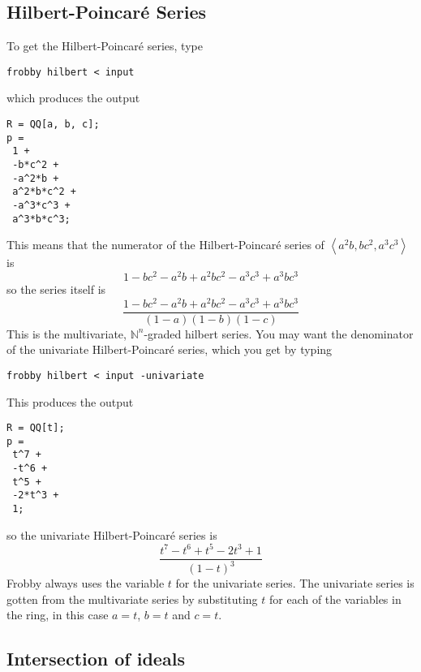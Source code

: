 \documentclass{amsart}
\theoremstyle{definition}
\newcommand{\hp}{Hilbert-Poincar\'e}
\newcommand{\hps}{Hilbert-Poincar\'e series}
\newcommand{\N}{\mathbb{N}}
\newcommand{\ideal}[1]{\left<#1\right>}
\begin{document}
\subsection{\hp{} Series}

To get the \hps{}, type
\begin{verbatim}
frobby hilbert < input
\end{verbatim}
which produces the output
\begin{verbatim}
R = QQ[a, b, c];
p =
 1 +
 -b*c^2 +
 -a^2*b +
 a^2*b*c^2 +
 -a^3*c^3 +
 a^3*b*c^3;
\end{verbatim}
This means that the numerator of the \hps{} of $\ideal{a^2b,bc^2,a^3c^3}$ is
\[
 1 
 -bc^2 
 -a^2b +
 a^2bc^2 
 -a^3c^3 +
 a^3bc^3
\]
so the series itself is
\[
\frac{ 
 1 
 -bc^2 
 -a^2b +
 a^2bc^2 
 -a^3c^3 +
 a^3bc^3
}{
(1-a)(1-b)(1-c)}
\]
This is the multivariate, $\N^n$-graded hilbert series. You may want
the denominator of the univariate \hps{}, which you get by typing
\begin{verbatim}
frobby hilbert < input -univariate
\end{verbatim}
This produces the output
\begin{verbatim}
R = QQ[t];
p =
 t^7 +
 -t^6 +
 t^5 +
 -2*t^3 +
 1;
\end{verbatim}
so the univariate \hps{} is
\[
\frac{
 t^7 
 -t^6 +
 t^5 
 -2t^3 +
 1}{(1-t)^3}
\]
Frobby always uses the variable $t$ for the univariate series. The
univariate series is gotten from the multivariate series by
substituting $t$ for each of the variables in the ring, in this case
$a=t$, $b=t$ and $c=t$.

\subsection{Intersection of ideals}
\end{document}
